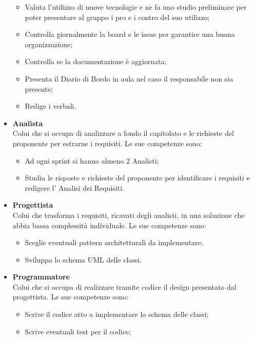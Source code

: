 \begin{itemize}
\begin{itemize}
              \item Valuta l'utilizzo di nuove tecnologie e ne fa uno studio preliminare per poter
                    presentare al gruppo i pro e i contro del suo utilizzo;
              \item Controlla giornalmente la board e le issue per garantire una buona
                    organizzazione;
              \item Controlla se la documentazione è aggiornata;
              \item Presenta il Diario di Bordo in aula nel caso il responsabile non sia presente;
              \item Redige i verbali.
          \end{itemize}
    \item \textbf{Analista}\\
          Colui che si occupa di analizzare a fondo il capitolato e le richieste del proponente per estrarne i requisiti.
          Le sue competenze sono:
          \begin{itemize}
              \item Ad ogni sprint si hanno almeno 2 Analisti;
              \item Studia le risposte e richieste del proponente per identificare i requisiti e
                    redigere l' Analisi dei Requisiti.
          \end{itemize}
    \item \textbf{Progettista}\\
          Colui che trasforma i requisiti, ricavati degli analisti, in una soluzione che abbia bassa complessità individuale.
          Le sue competenze sono:
          \begin{itemize}
              \item Sceglie eventuali pattern architetturali da implementare;
              \item Sviluppa lo schema UML delle classi.
          \end{itemize}
    \item \textbf{Programmatore}\\
          Colui che si occupa di realizzare tramite codice il design presentato dal progettista.
          Le sue competenze sono:
          \begin{itemize}
              \item Scrive il codice atto a implementare lo schema delle classi;
              \item Scrive eventuali test per il codice;

\end{itemize}
\end{itemize}
